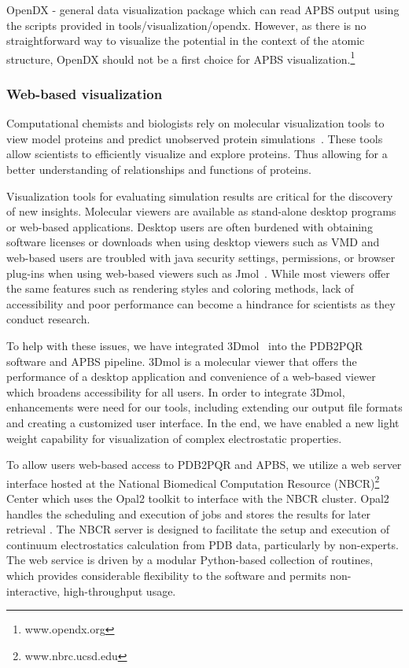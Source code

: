\documentclass[journal=jpcbfk, manuscript=article]{achemso}
\begin{document}
OpenDX - general data visualization package which can read APBS output using the scripts provided in tools/visualization/opendx. However, as there is no straightforward way to visualize the potential in the context of the atomic structure, OpenDX should not be a first choice for APBS visualization.\footnote{www.opendx.org}

\subsubsection{Web-based visualization}
Computational chemists and biologists rely on molecular visualization tools to view model proteins and predict unobserved protein simulations~\cite{Jones2005}. These tools allow scientists to efficiently visualize and explore proteins. Thus allowing for a better understanding of relationships and functions of proteins.  

Visualization tools for evaluating simulation results are critical for the discovery of new insights.  Molecular viewers are available as stand-alone desktop programs or web-based applications. Desktop users are often burdened with obtaining software licenses or downloads when using desktop viewers such as VMD and web-based users are troubled with java security settings, permissions, or browser plug-ins when using web-based viewers such as Jmol~\cite{herraez2006}. While most viewers offer the same features such as rendering styles and coloring methods, lack of accessibility and poor performance can become a hindrance for scientists as they conduct research. 

To help with these issues, we have integrated 3Dmol~\cite{rego2015} into the PDB2PQR software and APBS pipeline. 3Dmol is a molecular viewer that offers the performance of a desktop application and convenience of a web-based viewer which broadens accessibility for all users. In order to integrate 3Dmol, enhancements were need for our tools, including extending our output file formats and creating a customized user interface. In the end, we have enabled a new light weight capability for visualization of complex electrostatic properties.

To allow users web-based access to PDB2PQR and APBS, we utilize  a web server interface hosted at the National Biomedical Computation Resource (NBCR)\footnote{www.nbrc.ucsd.edu} Center which uses the Opal2 toolkit to interface with the NBCR cluster. Opal2 handles the scheduling and execution of jobs and stores the results for later retrieval  \cite{krishnan2009}.  The NBCR server is designed to facilitate the setup and execution of continuum electrostatics calculation from PDB data, particularly by non-experts. The web service is driven by a modular Python-based collection of routines, which provides considerable flexibility to the software and permits non-interactive, high-throughput usage. 
\end{document}
